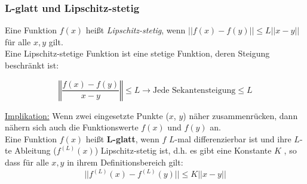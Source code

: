 \subsubsection{L-glatt und Lipschitz-stetig}

Eine Funktion \(f(x)\) heißt \emph{Lipschitz-stetig}, wenn \(||f(x) - f(y)|| \leq L ||x - y||\) für alle \(x, y\) gilt.\\

Eine Lipschitz-stetige Funktion ist eine stetige Funktion, deren Steigung beschränkt ist:

\begin{equation*}
    \left\Vert\frac{f(x)-f(y)}{x-y}\right\Vert \leq L \rightarrow \text{Jede Sekantensteigung} \leq L
\end{equation*}

\underline{Implikation:} Wenn zwei eingesetzte Punkte (\(x\), \(y\)) näher zusammenrücken, dann nähern sich auch die Funktionswerte \(f(x)\) und \(f(y)\) an.\\


Eine Funktion \(f(x)\) heißt \textbf{L-glatt}, wenn \(f\) \(L\)-mal differenzierbar ist und ihre \(L\)-te Ableitung (\(f^{(L)}(x)\)) Lipschitz-stetig ist, d.h. es gibt eine Konstante \(K\) , so dass für alle \(x, y\) in ihrem Definitionsbereich gilt:
\begin{equation*}
    ||f^{(L)}(x) - f^{(L)}(y)|| \leq K||x-y||
\end{equation*}
